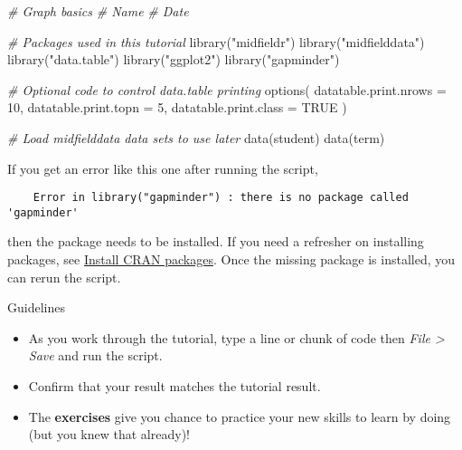 \documentclass[
]{book}
\newenvironment{Shaded}{\begin{snugshade}}{\end{snugshade}}
\newcommand{\AttributeTok}[1]{\textcolor[rgb]{0.77,0.63,0.00}{#1}}
\newcommand{\CommentTok}[1]{\textcolor[rgb]{0.56,0.35,0.01}{\textit{#1}}}
\newcommand{\ConstantTok}[1]{\textcolor[rgb]{0.00,0.00,0.00}{#1}}
\newcommand{\DecValTok}[1]{\textcolor[rgb]{0.00,0.00,0.81}{#1}}
\newcommand{\FunctionTok}[1]{\textcolor[rgb]{0.00,0.00,0.00}{#1}}
\newcommand{\NormalTok}[1]{#1}
\newcommand{\StringTok}[1]{\textcolor[rgb]{0.31,0.60,0.02}{#1}}
\providecommand{\tightlist}{%
  \setlength{\itemsep}{0pt}\setlength{\parskip}{0pt}}
\begin{document}
\begin{Shaded}
\begin{Highlighting}[]
\CommentTok{\# Graph basics }
\CommentTok{\# Name }
\CommentTok{\# Date }

\CommentTok{\# Packages used in this tutorial}
\FunctionTok{library}\NormalTok{(}\StringTok{"midfieldr"}\NormalTok{)}
\FunctionTok{library}\NormalTok{(}\StringTok{"midfielddata"}\NormalTok{)}
\FunctionTok{library}\NormalTok{(}\StringTok{"data.table"}\NormalTok{)}
\FunctionTok{library}\NormalTok{(}\StringTok{"ggplot2"}\NormalTok{)}
\FunctionTok{library}\NormalTok{(}\StringTok{"gapminder"}\NormalTok{)}

\CommentTok{\# Optional code to control data.table printing}
\FunctionTok{options}\NormalTok{(}
  \AttributeTok{datatable.print.nrows =} \DecValTok{10}\NormalTok{,}
  \AttributeTok{datatable.print.topn =} \DecValTok{5}\NormalTok{,}
  \AttributeTok{datatable.print.class =} \ConstantTok{TRUE}
\NormalTok{)}

\CommentTok{\# Load midfielddata data sets to use later}
\FunctionTok{data}\NormalTok{(student)}
\FunctionTok{data}\NormalTok{(term) }
\end{Highlighting}
\end{Shaded}

If you get an error like this one after running the script,

\begin{verbatim}
    Error in library("gapminder") : there is no package called 'gapminder'
\end{verbatim}

then the package needs to be installed. If you need a refresher on installing packages, see \protect\hyperlink{install-cran-packages}{Install CRAN packages}. Once the missing package is installed, you can rerun the script.

Guidelines

\begin{itemize}
\tightlist
\item
  As you work through the tutorial, type a line or chunk of code then \emph{File \textgreater{} Save} and run the script.\\
\item
  Confirm that your result matches the tutorial result.\\
\item
  The \textbf{exercises} give you chance to practice your new skills to learn by doing (but you knew that already)!
\end{itemize}
\end{document}
